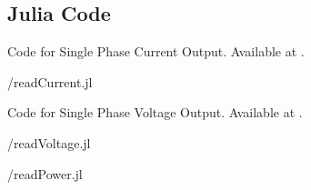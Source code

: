 \subsection{Julia Code}
\label{sec:modbus-julia-code}

\begin{juliacode}
  {Code for Single Phase Current Output.
    Available at .}
  \label{julia:current-modbus}
  
  {\LocMODjuliacode/readCurrent.jl}
\end{juliacode}

\begin{juliacode}
  {Code for Single Phase Voltage Output.
    Available at .}
  \label{julia:voltage-modbus}
  
  {\LocMODjuliacode/readVoltage.jl}
\end{juliacode}

\begin{juliacode}
  \label{julia:modbus-power}
  
  {\LocMODjuliacode/readPower.jl}
\end{juliacode}
